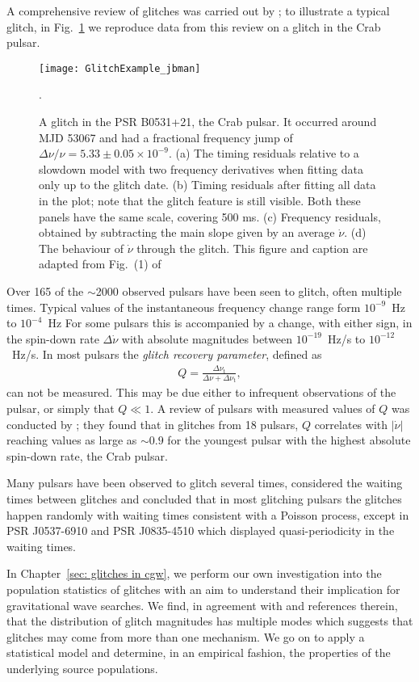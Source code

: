 A comprehensive review of glitches was carried out by
\citet{Espinoza2011}; to illustrate a typical glitch, in Fig.~\ref{fig: glitch}
we reproduce data from this review on a glitch in the Crab pulsar.
\begin{figure}[htb]
    \centering
    \texttt{[image: GlitchExample\_jbman]}
    \caption{
A glitch in the PSR B0531+21, the Crab pulsar. It occurred around MJD
53067 and had a fractional frequency jump of $\Delta\nu/\nu = 5.33 \pm 0.05
\times 10^{−9}$. (a) The timing residuals relative to a
slowdown model with two frequency derivatives when fitting data only up to the
glitch date. (b) Timing residuals after fitting all data in the plot; note
that the glitch feature is still visible. Both these panels have the same
scale, covering 500 ms. (c) Frequency residuals, obtained by subtracting the
main slope given by an average $\dot\nu$. (d) The behaviour of $\dot\nu$
through the glitch. This figure and caption are adapted from Fig.~(1) of
\citet{Espinoza2011}}.
    \label{fig: glitch}
\end{figure}

Over 165 of the $\sim$2000 observed pulsars have been seen to glitch, often multiple
times. Typical values of the instantaneous frequency change range form
$10^{-9}$~Hz to $10^{-4}$~Hz For some pulsars this is accompanied by a change,
with either sign, in the spin-down rate $\Delta\dot{\nu}$ with absolute
magnitudes between $10^{-19}$~Hz/s to $10^{-12}$~Hz/s.
In most pulsars the \emph{glitch recovery parameter}, defined as
\begin{align}
Q = \frac{\Delta\nu_\textrm{t}}{\Delta\nu + \Delta\nu_\textrm{t}},
\end{align}
can not be measured. This may be due either to infrequent observations of the
pulsar, or simply that $Q\ll1$.  A review of pulsars with measured values of
$Q$ was conducted by \citet{Lyne2000}; they found that in glitches from 18
pulsars, $Q$ correlates with $|\dot{\nu}|$ reaching values as large as
$\sim0.9$ for the youngest pulsar with the highest absolute spin-down rate,
the Crab pulsar.

Many pulsars have been observed to glitch several times, \citet{Melatos2008}
considered the waiting times between glitches and concluded that in most
glitching pulsars the glitches happen randomly with waiting times consistent
with a Poisson process, except in PSR J0537-6910 and PSR J0835-4510 which
displayed quasi-periodicity in the waiting times.

In Chapter~\ref{sec: glitches in cgw}, we perform our own investigation into the
population statistics of glitches with an aim to understand their implication
for gravitational wave searches. We find, in agreement with
\citet{Espinoza2011} and references therein, that the distribution of glitch
magnitudes has multiple modes which suggests that glitches may come from more
than one mechanism. We go on to apply a statistical model and determine, in an
empirical fashion, the properties of the underlying source populations.

